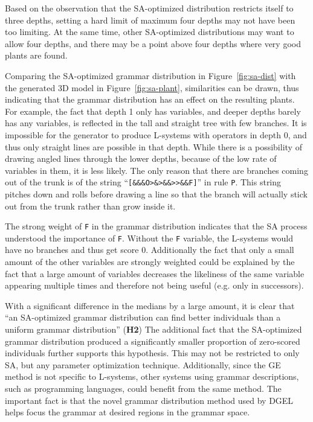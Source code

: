 Based on the observation that the \gls{SA}-optimized distribution restricts itself to three depths, setting a hard limit of maximum four depths may not have been too limiting.
At the same time, other \gls{SA}-optimized distributions may want to allow four depths, and there may be a point above four depths where very good plants are found.

Comparing the \gls{SA}-optimized grammar distribution in Figure~\ref{fig:sa-dist} with the generated 3D model in Figure~\ref{fig:sa-plant}, similarities can be drawn, thus indicating that the grammar distribution has an effect on the resulting plants.
For example, the fact that depth 1 only has variables, and deeper depths barely has any variables, is reflected in the tall and straight tree with few branches.
It is impossible for the generator to produce \glspl{L-system} with operators in depth 0, and thus only straight lines are possible in that depth.
While there is a possibility of drawing angled lines through the lower depths, because of the low rate of variables in them, it is less likely.
The only reason that there are branches coming out of the trunk is of the string ``\texttt{[\&\&\&O>\&>\&\&>{}>\&\&F]}'' in rule \texttt{P}.
This string pitches down and rolls before drawing a line so that the branch will actually stick out from the trunk rather than grow inside it.

The strong weight of \texttt{F} in the grammar distribution indicates that the \gls{SA} process understood the importance of \texttt{F}.
Without the \texttt{F} variable, the \glspl{L-system} would have no branches and thus get score 0.
Additionally the fact that only a small amount of the other variables are strongly weighted could be explained by the fact that a large amount of variables decreases the likeliness of the same variable appearing multiple times and therefore not being useful (e.g. only in successors).

With a significant difference in the medians by a large amount, it is clear that ``an \gls{SA}-optimized grammar distribution can find better individuals than a uniform grammar distribution'' (\textbf{H2})
The additional fact that the \gls{SA}-optimized grammar distribution produced a significantly smaller proportion of zero-scored individuals further supports this hypothesis.
This may not be restricted to only \gls{SA}, but any parameter optimization technique.
Additionally, since the \gls{GE} method is not specific to \glspl{L-system}, other systems using grammar descriptions, such as programming languages, could benefit from the same method.
The important fact is that the novel grammar distribution method used by \gls{DGEL} helps focus the grammar at desired regions in the grammar space.

